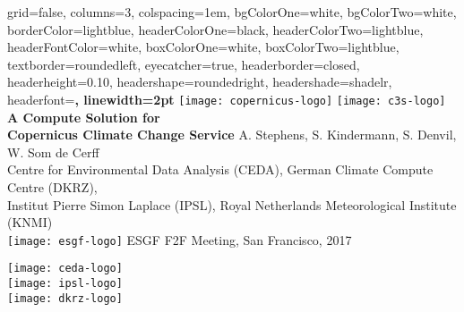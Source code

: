 \documentclass[portrait,a0paper,fontscale=0.4]{baposter} %
\begin{document}


\begin{poster}%
  {
  grid=false,
  columns=3,
  colspacing=1em,
  bgColorOne=white, %
  bgColorTwo=white, %
  borderColor=lightblue, %
  headerColorOne=black, %
  headerColorTwo=lightblue, %
  headerFontColor=white, %
  boxColorOne=white, %
  boxColorTwo=lightblue,
  textborder=roundedleft,
  eyecatcher=true, %
  headerborder=closed, %
  headerheight=0.10\textheight, %
  headershape=roundedright, %
  headershade=shadelr,
  headerfont=\Large\bf\textsc, %
  linewidth=2pt
  }
  {
      \texttt{[image: copernicus-logo]}
      \texttt{[image: c3s-logo]}
  }
  {\sf\bf
          A Compute Solution for\\ Copernicus Climate Change Service
  }
  {
    \vspace{1em} A. Stephens, S. Kindermann, S. Denvil, W. Som de Cerff\\
    {\smaller Centre for Environmental Data Analysis (CEDA),
    German Climate Compute Centre (DKRZ),\\
    Institut Pierre Simon Laplace (IPSL),
    Royal Netherlands Meteorological Institute (KNMI)\\[1em]
    \texttt{[image: esgf-logo]} ESGF F2F Meeting, San Francisco, 2017}
  }
  {
    \begin{minipage}{10em}
      \texttt{[image: ceda-logo]} \\
      \texttt{[image: ipsl-logo]} \\
      \texttt{[image: dkrz-logo]}
    \end{minipage}
  }


\end{poster}
\end{document}
